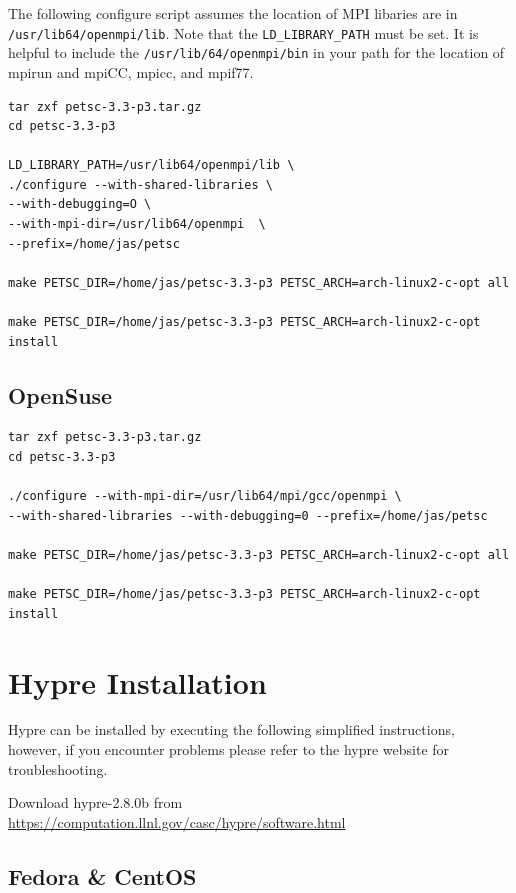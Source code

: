 \documentclass[12pt]{article}
\begin{document}
The following configure script assumes the location of MPI libaries
are in \texttt{/usr/lib64/openmpi/lib}.  Note that the
\texttt{LD\_LIBRARY\_PATH} must be set.  It is helpful to include the
\texttt{/usr/lib/64/openmpi/bin} in your path for the location of
mpirun and mpiCC, mpicc, and mpif77.

\begin{verbatim}
tar zxf petsc-3.3-p3.tar.gz
cd petsc-3.3-p3

LD_LIBRARY_PATH=/usr/lib64/openmpi/lib \
./configure --with-shared-libraries \
--with-debugging=O \
--with-mpi-dir=/usr/lib64/openmpi  \
--prefix=/home/jas/petsc

make PETSC_DIR=/home/jas/petsc-3.3-p3 PETSC_ARCH=arch-linux2-c-opt all

make PETSC_DIR=/home/jas/petsc-3.3-p3 PETSC_ARCH=arch-linux2-c-opt install

\end{verbatim}

\subsection{OpenSuse}

\begin{verbatim}
tar zxf petsc-3.3-p3.tar.gz
cd petsc-3.3-p3

./configure --with-mpi-dir=/usr/lib64/mpi/gcc/openmpi \
--with-shared-libraries --with-debugging=0 --prefix=/home/jas/petsc

make PETSC_DIR=/home/jas/petsc-3.3-p3 PETSC_ARCH=arch-linux2-c-opt all

make PETSC_DIR=/home/jas/petsc-3.3-p3 PETSC_ARCH=arch-linux2-c-opt install

\end{verbatim}


\section{Hypre Installation}

Hypre can be installed by executing the following simplified
instructions, however, if you encounter problems please refer to the
hypre website for troubleshooting.

Download hypre-2.8.0b from
\url{https://computation.llnl.gov/casc/hypre/software.html}

\subsection{Fedora \& CentOS}
\end{document}
